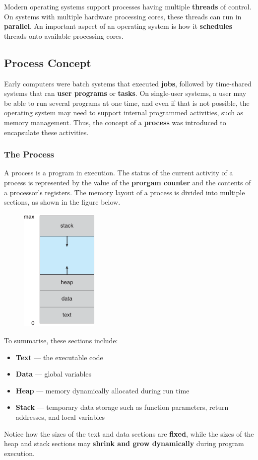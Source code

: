 \documentclass{article}
\begin{document}
Modern operating systems support processes having multiple
\textbf{threads} of control. On systems with multiple hardware
processing cores, these threads can run in \textbf{parallel}. An
important aspect of an operating system is how it \textbf{schedules}
threads onto available processing cores.
\subsection{Process Concept}
Early computers were batch systems that executed \textbf{jobs},
followed by time-shared systems that ran \textbf{user programs} or
\textbf{tasks}. On single-user systems, a user may be able to run
several programs at one time, and even if that is not possible, the
operating system may need to support internal programmed activities,
such as memory management. Thus, the concept of a \textbf{process} was
introduced to encapsulate these activities.
\subsubsection{The Process}
A process is a program in execution. The status of the current activity
of a process is represented by the value of the \textbf{prorgam
counter} and the contents of a processor's registers. The memory layout
of a process is divided into multiple sections, as shown in the figure
below.
\begin{figure}[H]
    \centering
    \includegraphics[height = 6cm]{figures/process_memory_layout.pdf}
\end{figure}
To summarise, these sections include:
\begin{itemize}
    \item \textbf{Text} --- the executable code
    \item \textbf{Data} --- global variables
    \item \textbf{Heap} --- memory dynamically allocated during run time
    \item \textbf{Stack} --- temporary data storage such as function
          parameters, return addresses, and local variables
\end{itemize}
Notice how the sizes of the text and data sections are
\textbf{fixed}, while the sizes of the heap and stack sections may
\textbf{shrink and grow dynamically} during program execution.
\end{document}
